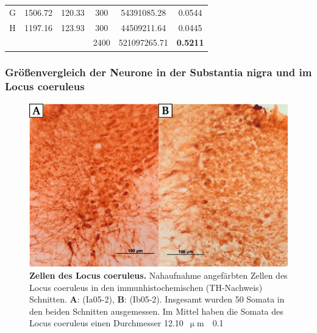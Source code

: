 \begin{table}[H]
{\begin{tabular}{cccccc}
G                                 & 1506.72                                 & 120.33                                   & 300                                    & 54391085.28                                & 0.0544                                     \\
H                                 & 1197.16                                 & 123.93                                   & 300                                    & 44509211.64                                & 0.0445                                     \\\hline
                                  &                                 &                                   & 2400                                   & 521097265.71                               & \textbf{0.5211}                           
\end{tabular}%
}
\end{table}


\subsubsection{Größenvergleich der Neurone in der Substantia nigra und im Locus coeruleus}

\begin{figure}[H]
    \centering
    \includegraphics{pictures/Bilder_monoamine_systeme/Zellen_LC.png}
    \caption[Zellen des Locus coeruleus]{\textbf{Zellen des Locus coeruleus.} Nahaufnahme angefärbten Zellen des Locus coeruleus in den immunhistochemischen (TH-Nachweis) Schnitten. \textbf{A}: (Ia05-2), \textbf{B}: (Ib05-2). Insgesamt wurden 50 Somata in den beiden Schnitten ausgemessen. Im Mittel haben die Somata des Locus coeruleus einen Durchmesser 12.10~$\upmu$m~\rpm~0.1}
    \label{fig:Zellen_LC}
\end{figure}

